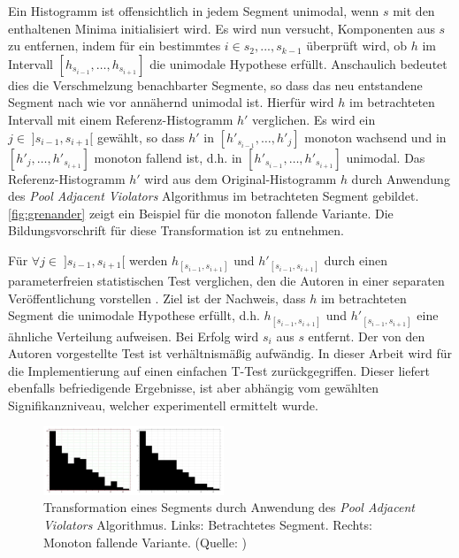 Ein Histogramm ist offensichtlich in jedem Segment unimodal, wenn $s$ mit den enthaltenen Minima initialisiert wird. Es wird nun versucht, Komponenten aus $s$ zu entfernen, indem für ein bestimmtes $i \in s_2, ..., s_{k-1}$ überprüft wird, ob $h$ im Intervall $[h_{s_{i-1}}, \ldots,  h_{s_{i+1}}]$ die \glqq{}unimodale Hypothese\grqq{} erfüllt. Anschaulich bedeutet dies die Verschmelzung benachbarter Segmente, so dass das neu entstandene Segment nach wie vor \glqq{}annähernd unimodal ist\grqq{}. Hierfür wird $h$ im betrachteten Intervall mit einem Referenz-Histogramm $h'$ verglichen. Es wird ein $j \in \; ]s_{i-1}, s_{i+1}[$ gewählt, so dass $h'$ in $[h'_{s_{i-1}}, \ldots,  h'_j]$ monoton wachsend und in $[h'_j, \ldots,  h'_{s_{i+1}}]$ monoton fallend ist, d.h. in $[h'_{s_{i-1}}, \ldots,  h'_{s_{i+1}}]$ unimodal. Das Referenz-Histogramm $h'$ wird aus dem Original-Histogramm $h$ durch Anwendung des \emph{Pool Adjacent Violators} Algorithmus im betrachteten Segment gebildet. \autoref{fig:grenander} zeigt ein Beispiel für die monoton fallende Variante. Die Bildungsvorschrift für diese Transformation ist \citep{acopa, ftc} zu entnehmen. 

Für $\forall j \in \; ]s_{i-1}, s_{i+1}[$ werden $h_{[s_{i-1}, s_{i+1}]}$ und $h'_{[s_{i-1}, s_{i+1}]}$ durch einen parameterfreien statistischen Test verglichen, den die Autoren in einer separaten Veröffentlichung vorstellen \citep{ftc}. Ziel ist der Nachweis, dass $h$ im betrachteten Segment die \glqq{}unimodale Hypothese\grqq{} erfüllt, d.h. $h_{[s_{i-1}, s_{i+1}]}$ und $h'_{[s_{i-1}, s_{i+1}]}$ eine ähnliche Verteilung aufweisen. Bei Erfolg wird $s_i$ aus $s$ entfernt. Der von den Autoren vorgestellte Test ist verhältnismäßig aufwändig. In dieser Arbeit wird für die Implementierung auf einen einfachen T-Test zurückgegriffen. Dieser liefert ebenfalls befriedigende Ergebnisse, ist aber abhängig vom gewählten Signifikanzniveau, welcher experimentell ermittelt wurde.

\begin{figure}[]
\centering
\includegraphics[width=0.48\textwidth]{img/grenander.png}
\caption{Transformation eines Segments durch Anwendung des \emph{Pool Adjacent Violators} Algorithmus. Links: Betrachtetes Segment. Rechts: Monoton fallende Variante. (Quelle: \citep{acopa})}
\label{fig:grenander}
\end{figure}

